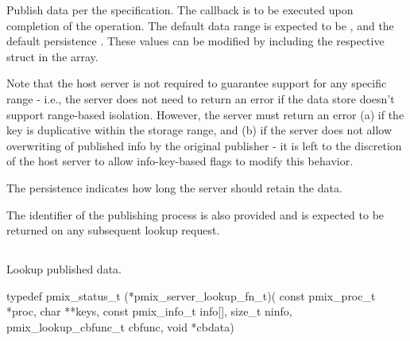 \descr

Publish data per the  specification.
The callback is to be executed upon completion of the operation.
The default data range is expected to be , and the default persistence .
These values can be modified by including the respective  struct in the  array.

Note that the host server is not required to guarantee support for any specific range - i.e., the server does not need to return an error if the data store doesn't support range-based isolation.
However, the server must return an error (a) if the key is duplicative within the storage range, and (b) if the server does not allow overwriting of published info by the original publisher - it is left to the discretion of the host server to allow info-key-based flags to modify this behavior.

The persistence indicates how long the server should retain the data.

The identifier of the publishing process is also provided and is expected to be returned on any subsequent lookup request.


\subsection{}

\summary

Lookup published data.

\format

\cspecificstart
\begin{codepar}
typedef pmix_status_t (*pmix_server_lookup_fn_t)(
                             const pmix_proc_t *proc, char **keys,
                             const pmix_info_t info[], size_t ninfo,
                             pmix_lookup_cbfunc_t cbfunc, void *cbdata)
\end{codepar}
\cspecificend

\begin{arglist}
\end{arglist}

